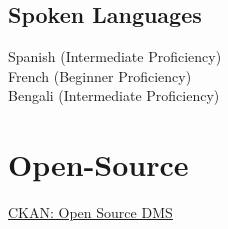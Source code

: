\documentclass[]{deedy-resume-openfont}
\begin{document}
\begin{minipage}[t]{0.31\textwidth}
\subsection{Spoken Languages}
Spanish (Intermediate Proficiency) \\
French (Beginner Proficiency)\\
Bengali (Intermediate Proficiency)
\\[1\baselineskip]

\section{Open-Source}
\textbullet{} \color{cyan}\underline{\color{cyan}\href{https://github.com/ckan/ckan}{\color{cyan}CKAN: Open Source DMS}}

%
%

\end{minipage} 
\hfill
\end{document}
